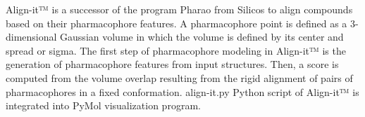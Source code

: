 Align-it™ is a successor of the program Pharao from Silicos to align compounds based on their pharmacophore features. A pharmacophore point is defined as a 3-dimensional Gaussian volume in which the volume is defined by its center and spread or sigma.
The first step of pharmacophore modeling in Align-it™ is the generation of pharmacophore features from input structures. Then, a score is computed from the volume overlap resulting from the rigid alignment of pairs of pharmacophores in a fixed conformation. align-it.py Python script of Align-it™ is integrated into PyMol visualization program.
